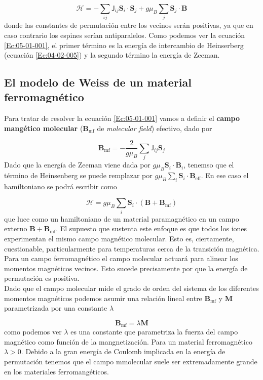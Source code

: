 \documentclass[12pt,a4paper]{book}
\numberwithin{equation}{section}
\numberwithin{figure}{section}
\newcommand{\eff}{\mathrm{eff}}
\newcommand{\mf}{\mathrm{mf}}
\newcommand{\Hcal}{\mathcal{H}}
\newcommand{\Jsf}{\mathsf{J}}
\newcommand{\Bn}{\mathbf{B}}
\newcommand{\Mn}{\mathbf{M}}
\newcommand{\Sn}{\mathbf{S}}
\begin{document}
\begin{equation}
    \Hcal = - \sum_{ij} \Jsf_{ij} \Sn_i \cdot \Sn_j + g \mu_B \sum_j \Sn_j \cdot \Bn \label{Ec:05-01-001}
\end{equation}
donde las constantes de permutación entre los vecinos serán positivas, ya que en caso contrario los espines serían antiparalelos. Como podemos ver la ecuación \ref{Ec:05-01-001}, el primer término es la energía de intercambio de Heinserberg (ecuación \ref{Ec:04-02-005}) y la segundo término la energía de Zeeman. 

\subsection{El modelo de Weiss de un material ferromagnético}

Para tratar de resolver la ecuación \ref{Ec:05-01-001} vamos a definir el \textbf{campo mangético molecular} ($\Bn_\mf$ de \textit{molecular field}) efectivo, dado por

\begin{equation}
    \Bn_{\mf} = -\frac{2}{g \mu_B} \sum_j \Jsf_{ij} \Sn_j \label{Ec:05-01-002}
\end{equation}
Dado que la energía de Zeeman viene dada por $g \mu_B \Sn_i \cdot \Bn_i$, tenemso que el término de Heinsenberg se puede remplazar por $g \mu_B \sum_i \Sn_i \cdot \Bn_\eff$. En ese caso el hamiltoniano se podrá escribir como

\begin{equation}
    \Hcal = g \mu_B \sum_i \Sn_i \cdot (\Bn + \Bn_\mf) \label{Ec:05-01-003}
\end{equation}
que luce como un hamiltoniano de un material paramagnético en un campo externo $\Bn + \Bn_\mf$. El supuesto que sustenta este enfoque es que todos los iones experimentan el mismo campo magnético molecular. Esto es, ciertamente, cuestionable, particularmente para temperaturas cerca de la transición magnética. Para un campo ferromagnético el campo molecular actuará para alinear los momentos magnéticos vecinos. Esto sucede precisamente por que la energía de permutación es positiva. \\

Dado que el campo molecular mide el grado de orden del sistema de los diferentes momentos magnéticos podemos asumir una relación lineal entre $\Bn_\mf$ y $\Mn$ parametrizada por una constante $\lambda$ 

\begin{equation}
    \Bn_\mf = \lambda \Mn \label{Ec:05-01-004}
\end{equation}
como podemos ver $\lambda$ es una constante que parametriza la fuerza del campo magnético como función de la mangnetización. Para un material ferromagnético $\lambda>0$. Debido a la gran energía de Coulomb implicada en la energía de permutación tenemos que el campo mmolecular suele ser extremadamente grande en los materiales ferromangéticos. \\
\end{document}
